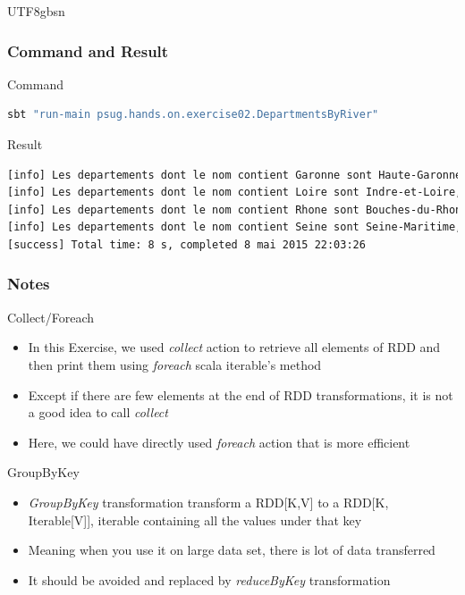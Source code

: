 \documentclass[slidetop,9pt,utf8]{beamer}
\begin{document}
\begin{CJK}{UTF8}{gbsn}
\begin{frame}
\end{frame}

\begin{frame}[fragile]
  \frametitle{Command and Result}

  \begin{block}{Command}
    \begin{lstlisting}[language=bash, style=terminal-medium]
sbt "run-main psug.hands.on.exercise02.DepartmentsByRiver"
    \end{lstlisting}
  \end{block}

  \begin{block}{Result}
    \begin{lstlisting}[language=bash, style=terminal]
[info] Les departements dont le nom contient Garonne sont Haute-Garonne, Lot-et-Garonne, Tarn-et-Garonne
[info] Les departements dont le nom contient Loire sont Indre-et-Loire, Loire, Haute-Loire, Loire-Atlantique, Loiret, Maine-et-Loire, Saone-et-Loire
[info] Les departements dont le nom contient Rhone sont Bouches-du-Rhone, Rhone
[info] Les departements dont le nom contient Seine sont Seine-Maritime, Seine-et-Marne, Hauts-de-Seine, Seine-Saint-Denis
[success] Total time: 8 s, completed 8 mai 2015 22:03:26
    \end{lstlisting}
  \end{block}

\end{frame}

\begin{frame}
  \frametitle{Notes}

  \begin{exampleblock}{Collect/Foreach}
    \begin{itemize}
      \item In this Exercise, we used \textit{collect} action to retrieve all elements of RDD and then print them using \textit{foreach} scala iterable's method
      \item Except if there are few elements at the end of RDD transformations, it is not a good idea to call \textit{collect}
      \item Here, we could have directly used \textit{foreach} action that is more efficient
    \end{itemize}
  \end{exampleblock}

  \begin{exampleblock}{GroupByKey}
    \begin{itemize}
      \item \textit{GroupByKey} transformation transform a RDD[K,V] to a RDD[K, Iterable[V]], iterable containing all the values under that key
      \item Meaning when you use it on large data set, there is lot of data transferred
      \item It should be avoided and replaced by \textit{reduceByKey} transformation
    \end{itemize}
  \end{exampleblock}


\end{frame}
\end{CJK}
\end{document}
